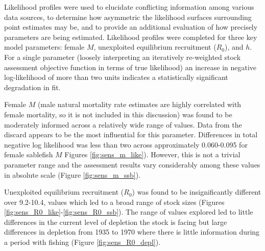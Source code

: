 \documentclass[11pt,
  english,
  a4paper,
]{article}
\begin{document}
\leavevmode\tagmcend\tagstructend


Likelihood profiles were used to elucidate conflicting information among various data sources, to determine how asymmetric the likelihood surfaces surrounding point estimates may be, and to provide an additional evaluation of how precisely parameters are being estimated. Likelihood profiles were completed for three key model parameters: female {\(M\)\leavevmode\tagmcend\tagstructend}, unexploited equilibrium recruitment ({\(R_0\)\leavevmode\tagmcend\tagstructend}), and {\(h\)\leavevmode\tagmcend\tagstructend}. For a single parameter (loosely interpreting an iteratively re-weighted stock assessment objective function in terms of true likelihood) an increase in negative log-likelihood of more than two units indicates a statistically significant degradation in fit.

\leavevmode\tagmcend\tagstructend\par


Female {\(M\)\leavevmode\tagmcend\tagstructend} (male natural mortality rate estimates are highly correlated with female mortality, so it is not included in this discussion) was found to be moderately informed across a relatively wide range of values. Data from the discard appears to be the most influential for this parameter. Differences in total negative log likelihood was less than two across approximately 0.060-0.095 for female sablefish {\(M\)\leavevmode\tagmcend\tagstructend} Figures \ref{fig:sens_m_like}). However, this is not a trivial parameter range and the assessment results vary considerably among these values in absolute scale (Figure \ref{fig:sens_m_ssb}).

\leavevmode\tagmcend\tagstructend\par


Unexploited equilibrium recruitment ({\(R_0\)\leavevmode\tagmcend\tagstructend}) was found to be insignificantly different over 9.2-10.4, values which led to a broad range of stock sizes (Figures \ref{fig:sens_R0_like}-\ref{fig:sens_R0_ssb}). The range of values explored led to little differences in the current level of depletion the stock is facing but large differences in depletion from 1935 to 1970 where there is little information during a period with fishing (Figure \ref{fig:sens_R0_depl}).
\end{document}
